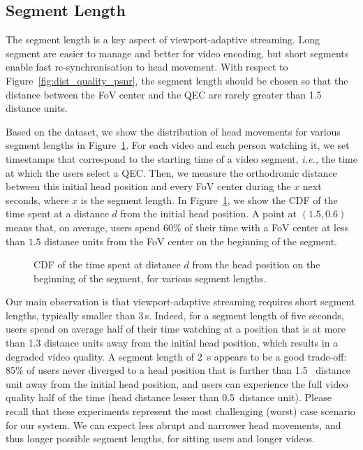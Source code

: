 \subsection{Segment Length}

The segment length is a key
aspect of viewport-adaptive streaming. Long segment are easier to manage and better for video encoding,
but short segments enable fast re-synchronisation to head movement. With respect to
Figure~\ref{fig:dist_quality_psnr}, the
segment length should be chosen so that the
distance between the FoV center and the QEC are rarely greater than 1.5 distance units.

Based on the dataset, we show the distribution of head movements for various segment lengths
in Figure~\ref{cdf-dataset}. For each video and each person watching
it, we set timestamps that correspond to the starting time of a video
segment, \textit{i.e.,} the time at which the users select a QEC. Then, we measure the orthodromic distance
between this initial head position and every FoV center during the $x$
next seconds, where $x$ is the segment length. In
Figure~\ref{cdf-dataset}, we show the \ac{CDF} of the time spent at a
distance $d$ from the initial head position. A point at $(1.5,0.6)$
means that, on average, users spend $60\%$ of their time with a FoV
center at less than $1.5$ distance units from the FoV center on the
beginning of the segment.

\begin{figure}[htbp]
\centering

\caption{CDF of the time spent at distance $d$ from the head position on the beginning of the
segment, for various segment lengths.}\label{cdf-dataset}
\end{figure}

Our main observation is that viewport-adaptive streaming requires
short segment lengths, typically smaller than 3\,s. Indeed, for a
segment length of five seconds, users spend on average half of their
time watching at a position that is at more than 1.3 distance units
away from the initial head position, which results in a degraded video
quality. A segment length of \SI{2}{\second} appears to be a good trade-off:
85\% of
users never diverged to a head position that is further than 1.5~
distance unit away from the initial head position, and users can experience the full
video quality half of the time (head distance lesser than 0.5~distance unit). Please recall that
these experiments represent the most challenging (worst) case scenario
for our system. We can expect less abrupt and narrower head movements,
and thus longer possible segment lengths, for sitting users and longer
videos.

